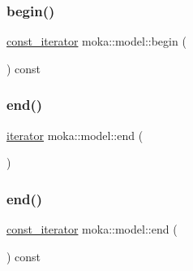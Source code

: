 \mbox{\label{classmoka_1_1model_a272fffdb8a114d785aaa9993377dce48}} 
\subsubsection{\texorpdfstring{begin()}{begin()}\hspace{0.1cm}{\footnotesize\ttfamily [2/2]}}
{\footnotesize\ttfamily \mbox{\hyperlink{classmoka_1_1model_a2320ba22d7cfd04cd0bba753ab8e10a8}{const\+\_\+iterator}} moka\+::model\+::begin (\begin{DoxyParamCaption}{ }\end{DoxyParamCaption}) const}

\mbox{\label{classmoka_1_1model_a4a405fccf852e3dc82ce06440d131ecc}} 
\subsubsection{\texorpdfstring{end()}{end()}\hspace{0.1cm}{\footnotesize\ttfamily [1/2]}}
{\footnotesize\ttfamily \mbox{\hyperlink{classmoka_1_1model_a2fa7c32a9fe64904609be78bb8d1abdf}{iterator}} moka\+::model\+::end (\begin{DoxyParamCaption}{ }\end{DoxyParamCaption})}

\mbox{\label{classmoka_1_1model_a315c37c8781daaef2f0fa3e8da2821da}} 
\subsubsection{\texorpdfstring{end()}{end()}\hspace{0.1cm}{\footnotesize\ttfamily [2/2]}}
{\footnotesize\ttfamily \mbox{\hyperlink{classmoka_1_1model_a2320ba22d7cfd04cd0bba753ab8e10a8}{const\+\_\+iterator}} moka\+::model\+::end (\begin{DoxyParamCaption}{ }\end{DoxyParamCaption}) const}

\mbox{\label{classmoka_1_1model_a002567d771059e2a2c0666d276508f4b}} 
